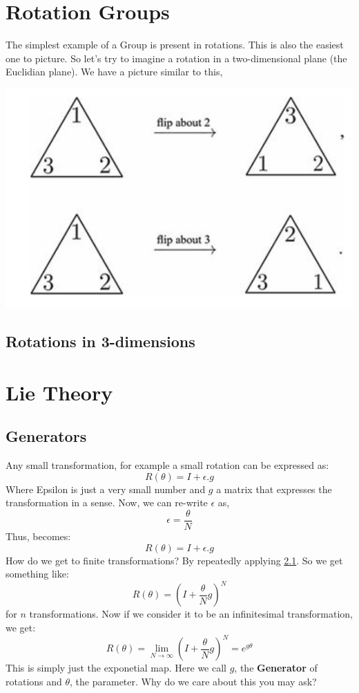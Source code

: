 \documentclass[]{article}
\begin{document}
\section{Rotation Groups}
The simplest example of a Group is present in rotations. This is also the easiest one to picture. So let's try to imagine a rotation in a two-dimensional plane (the Euclidian plane). We have a picture similar to this,
\begin{center}
	\includegraphics[width= 0.8\paperwidth, height= 0.8\paperheight]{2.png}
\end{center}
\subsection{Rotations in 3-dimensions}

\section{Lie Theory}
\subsection{Generators}
Any small transformation, for example a small rotation can be expressed as:
\begin{equation}
R(\theta) = I + \epsilon. g
\end{equation}
Where Epsilon is just a very small number and $g$ a matrix that expresses the transformation in a sense. Now, we can re-write $\epsilon$ as,
$$\epsilon = \frac{\theta}{N}$$
Thus, becomes:
\begin{equation}
R(\theta) = I + \epsilon. g
\end{equation}
How do we get to finite transformations? By repeatedly applying \ref{}. So we get something like:
\begin{equation}
R(\theta) = (I + \frac{\theta}{N}g)^{N}
\end{equation}
for $n$ transformations. Now if we consider it to be an infinitesimal transformation, we get:
\begin{equation}
R(\theta) = \lim\limits_{N \rightarrow \infty}(I + \frac{\theta}{N}g)^{N} = e^{g \theta}
\end{equation}
This is simply just the exponetial map. Here we call $g$, the \textbf{Generator} of rotations and $\theta$, the parameter. Why do we care about this you may ask?
\end{document}
